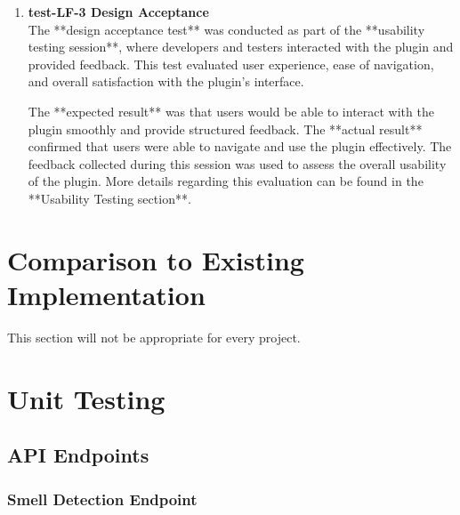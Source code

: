 \documentclass[12pt, titlepage]{article}
\begin{document}
\begin{enumerate}
\item \textbf{test-LF-3 Design Acceptance} \\[2mm]
The **design acceptance test** was conducted as part of the **usability testing session**, where developers and testers interacted with the plugin and provided feedback. This test evaluated user experience, ease of navigation, and overall satisfaction with the plugin’s interface.

The **expected result** was that users would be able to interact with the plugin smoothly and provide structured feedback. The **actual result** confirmed that users were able to navigate and use the plugin effectively. The feedback collected during this session was used to assess the overall usability of the plugin. More details regarding this evaluation can be found in the **Usability Testing section**.

\end{enumerate}


\section{Comparison to Existing Implementation}	

This section will not be appropriate for every project.

\section{Unit Testing}
\newcommand{\testcount}{\stepcounter{testcase}\thetestcase}
\renewcommand{\arraystretch}{1.2} %

\subsection{API Endpoints}

\subsubsection{Smell Detection Endpoint}
\end{document}

